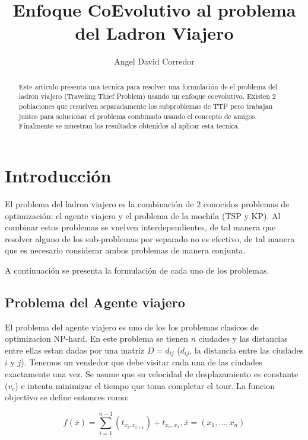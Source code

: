 \documentclass[twocolumn]{IEEEtran}
\begin{document}
\title{Enfoque CoEvolutivo al problema del Ladron Viajero}
\author{Angel David Corredor}
\date{}
\maketitle

\begin{abstract}
    Este articulo presenta una tecnica para resolver una formulación de el problema del
    ladron viajero (Traveling Thief Problem) usando un enfoque coevolutivo.
    Existen 2 poblaciones que resuelven separadamente los subproblemas de TTP
    pero trabajan juntos para solucionar el problema combinado usando el concepto de amigos.
    Finalmente se muestran los resultados obtenidos al aplicar esta tecnica. 
\end{abstract}

\section{Introducción}

El problema del ladron viajero es la combinación de 2 conocidos problemas de 
optimización: el agente viajero y el problema de la mochila (TSP y KP).
Al combinar estos problemas se vuelven interdependientes, de tal manera que resolver
alguno de los sub-problemas por separado no es efectivo, de tal manera que es necesario
considerar ambos problemas de manera conjunta.

A continuación se presenta la formulación de cada uno de los problemas.

\subsection{Problema del Agente viajero}

El problema del agente viajero es uno de los los problemas clasicos de optimizacion NP-hard.
En este problema se tienen $n$ ciudades y las distancias entre ellas estan dadas por una matriz
$D=d_{ij}$ ($d_{ij}$, la distancia entre las ciudades $i$ y $j$).
Tenemos un vendedor que debe visitar cada una de las ciudades exactamente una vez. Se asume que 
su velocidad de desplazamiento es constante ($v_c$) e intenta minimizar el tiempo que toma completar
el tour.
La funcion objectivo se define entonces como:

\begin{equation}
    f(\bar{x}) =
    \sum_{i=1}^{n-1} (t_{x_i,x_{i+1}})
    + t_{x_n,x_1},
    \bar{x}=(x_1,...,x_n)
\end{equation}
\end{document}
